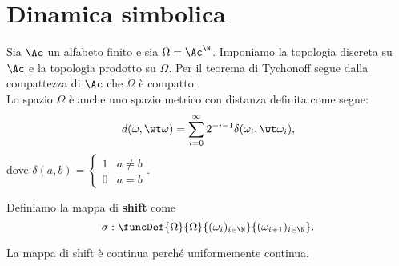 \section{Dinamica simbolica}
Sia $\Ac$ un alfabeto finito e sia $\Omega=\Ac^\N$. Imponiamo la topologia discreta su $\Ac$ e la topologia prodotto su $\Omega$. Per il teorema di Tychonoff segue dalla compattezza di $\Ac$ che $\Omega$ \`e compatto.\\
Lo spazio $\Omega$ \`e anche uno spazio metrico con distanza definita come segue:
\[d(\omega,\wt \omega)=\sum_{i=0}^\infty 2^{-i-1}\delta(\omega_i,\wt \omega_i),\]
dove $\delta(a,b)=\begin{cases}
1 & a\neq b\\
0 & a=b
\end{cases}$.

\begin{definition}[Shift]
Definiamo la mappa di \textbf{shift} come
\[\sigma:\funcDef{\Omega}{\Omega}{(\omega_i)_{i\in\N}}{(\omega_{i+1})_{i\in\N}}.\]
\end{definition}
\begin{remark}
La mappa di shift \`e continua perch\'e uniformemente continua.
\end{remark}


